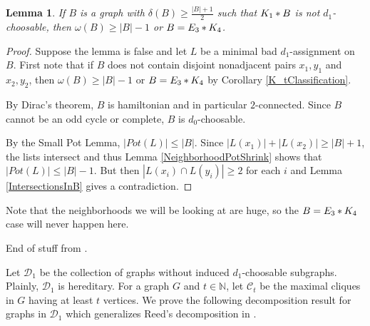 \documentclass[12pt]{amsart}
\theoremstyle{plain}
\newtheorem{lem}[thm]{Lemma}
\theoremstyle{definition}
\theoremstyle{plain}
\newcommand{\fancy}[1]{\mathcal{#1}}
\newcommand{\IN}{\mathbb{N}}
\newcommand{\CC}{\fancy{C}}
\newcommand{\D}{\fancy{D}}
\newcommand{\card}[1]{\left|#1\right|}
\newcommand{\join}[2]{#1 \mbox{\hspace{2 pt}$\ast$\hspace{2 pt}} #2}
\begin{document}
\begin{lem}\label{neighborhood}
If $B$ is a graph with $\delta(B) \geq \frac{\card{B} + 1}{2}$ such that
$\join{K_1}{B}$ is not $d_1$-choosable, then $\omega(B) \geq \card{B} - 1$ or
$B = \join{E_3}{K_4}$.
\end{lem}
\begin{proof}
Suppose the lemma is false and let $L$ be a minimal bad $d_1$-assignment on $B$.
First note that if $B$ does not contain disjoint nonadjacent pairs $x_1, y_1$
and $x_2, y_2$, then $\omega(B) \geq \card{B} - 1$ or
$B = \join{E_3}{K_4}$ by Corollary \ref{K_tClassification}.

By Dirac's theorem, $B$ is hamiltonian and in particular $2$-connected. Since
$B$ cannot be an odd cycle or complete, $B$ is $d_0$-choosable.

By the Small Pot Lemma, $\card{Pot(L)} \leq \card{B}$.  Since $\card{L(x_1)} +
\card{L(x_2)} \geq \card{B} + 1$, the lists intersect and thus Lemma
\ref{NeighborhoodPotShrink} shows that $\card{Pot(L)} \leq \card{B} - 1$. But
then $\card{L(x_i) \cap L(y_i)} \geq 2$ for each $i$ and Lemma
\ref{IntersectionsInB} gives a contradiction.
\end{proof}

Note that the neighborhoods we will be looking at are huge, so the $B =
\join{E_3}{K_4}$ case will never happen here.

End of stuff from \cite{mules}.

\bigskip

Let $\D_1$ be the collection of graphs without induced $d_1$-choosable
subgraphs.  Plainly, $\D_1$ is hereditary. For a graph $G$ and $t \in \IN$, let
$\CC_t$ be the maximal cliques in $G$ having at least $t$ vertices. We prove the
following decomposition result for graphs in $\D_1$ which generalizes Reed's decomposition in \cite{reed1999strengthening}.
\end{document}
